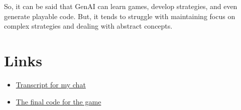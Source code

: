 \documentclass{article}
\begin{document}
So, it can be said that GenAI can learn games, develop strategies, and even generate playable code. But, it tends to struggle with maintaining focus on complex strategies and dealing with abstract concepts. 

\newpage

\section{Links}
\begin{itemize}
    \item \href{https://chat.openai.com/share/dee4d319-f2da-48be-8f3f-cdcc8f603116}{Transcript for my chat}

    \item \href{https://colab.research.google.com/drive/13c1AyFl__FLPmxBiya7yxov_iHZq7-l7?usp=sharing}{The final code for the game}
\end{itemize}
\end{document}
